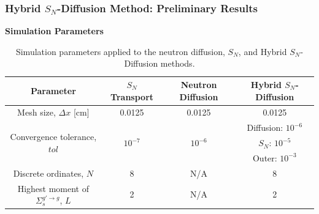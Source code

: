 \begin{frame}
  \frametitle{Hybrid $S_N$-Diffusion Method: Preliminary Results}
  \textbf{Simulation Parameters}
  \begin{table}
    \centering
    \footnotesize
    \caption{Simulation parameters applied to the neutron diffusion, $S_N$, and Hybrid
    $S_N$-Diffusion methods.}
    \begin{tabular}{c c c c}
      \toprule
      Parameter & $S_N$ Transport & Neutron Diffusion & Hybrid $S_N$-Diffusion \\
      \midrule
      Mesh size, $\Delta x$ [cm]        & 0.0125    & 0.0125    & 0.0125 \\[.2cm]
      \multirow{3}{*}{Convergence tolerance, $tol$}
                                        &           &           & Diffusion: $10^{-6}$ \\
                                        & $10^{-7}$ & $10^{-6}$ & $S_N$: $10^{-5}$ \\
                                        &           &           & Outer: $10^{-3}$ \\[.2cm]
      Discrete ordinates, $N$           & 8         & N/A       & 8 \\
      Highest moment of $\Sigma^{g'\rightarrow g}_s$, $L$
                                        & 2         & N/A       & 2 \\
      \bottomrule
    \end{tabular}
    \label{table:param}
  \end{table}
\end{frame}

